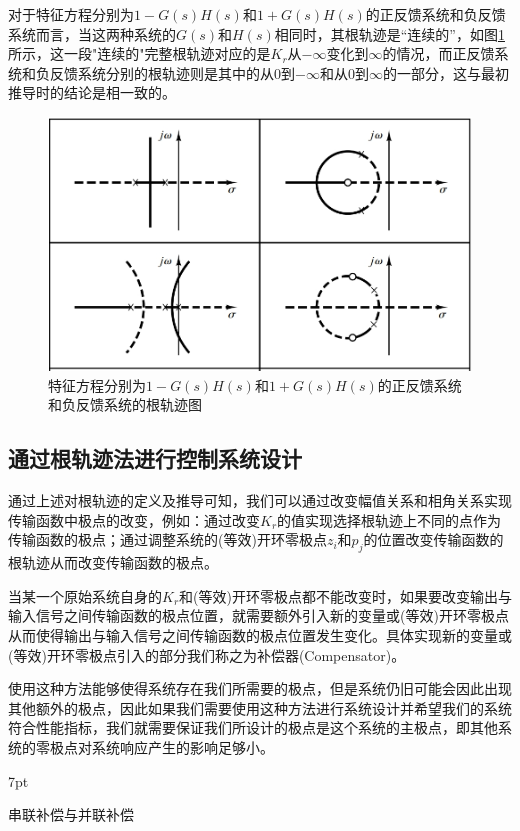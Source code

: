 \documentclass{article}
\numberwithin{equation}{section}
\numberwithin{figure}{section}
\newenvironment{formal}{%
\def\FrameCommand{%
\hspace{1pt}%
{\color{DarkBlue}\vrule width 2pt}%
{\color{formalshade}\vrule width 4pt}%
\colorbox{formalshade}%
}%
\MakeFramed{\advance\hsize-\width\FrameRestore}%
\noindent\hspace{-4.55pt}%
\begin{adjustwidth}{}{7pt}%
\vspace{2pt}\vspace{2pt}%
}
{%
\vspace{2pt}\end{adjustwidth}\endMakeFramed%
}
\begin{document}
对于特征方程分别为$1-G(s)H(s)$和$1+G(s)H(s)$的正反馈系统和负反馈系统而言，当这两种系统的$G(s)$和$H(s)$相同时，其根轨迹是“连续的”，如图\ref{PosandNegfbsyswithsameG(s)andH(s)}所示，这一段"连续的"完整根轨迹对应的是$K_r$从$-\infty$变化到$\infty$的情况，而正反馈系统和负反馈系统分别的根轨迹则是其中的从$0$到$-\infty$和从$0$到$\infty$的一部分，这与最初推导时的结论是相一致的。

\begin{figure}
    \centering
    \includegraphics[width=.6\textwidth]{Chapter6/PosandNegfbsyswithsameG(s)andH(s).png} %
    \caption{特征方程分别为$1-G(s)H(s)$和$1+G(s)H(s)$的正反馈系统和负反馈系统的根轨迹图} %
    \label{PosandNegfbsyswithsameG(s)andH(s)} %
\end{figure}

\subsection{通过根轨迹法进行控制系统设计}
通过上述对根轨迹的定义及推导可知，我们可以通过改变幅值关系和相角关系实现传输函数中极点的改变，例如：通过改变$K_r$的值实现选择根轨迹上不同的点作为传输函数的极点；通过调整系统的(等效)开环零极点$z_i$和$p_j$的位置改变传输函数的根轨迹从而改变传输函数的极点。

当某一个原始系统自身的$K_r$和(等效)开环零极点都不能改变时，如果要改变输出与输入信号之间传输函数的极点位置，就需要额外引入新的变量或(等效)开环零极点从而使得输出与输入信号之间传输函数的极点位置发生变化。具体实现新的变量或(等效)开环零极点引入的部分我们称之为补偿器(Compensator)。

使用这种方法能够使得系统存在我们所需要的极点，但是系统仍旧可能会因此出现其他额外的极点，因此如果我们需要使用这种方法进行系统设计并希望我们的系统符合性能指标，我们就需要保证我们所设计的极点是这个系统的主极点，即其他系统的零极点对系统响应产生的影响足够小。

\begin{formal}
    串联补偿与并联补偿
\end{formal}
\end{document}
